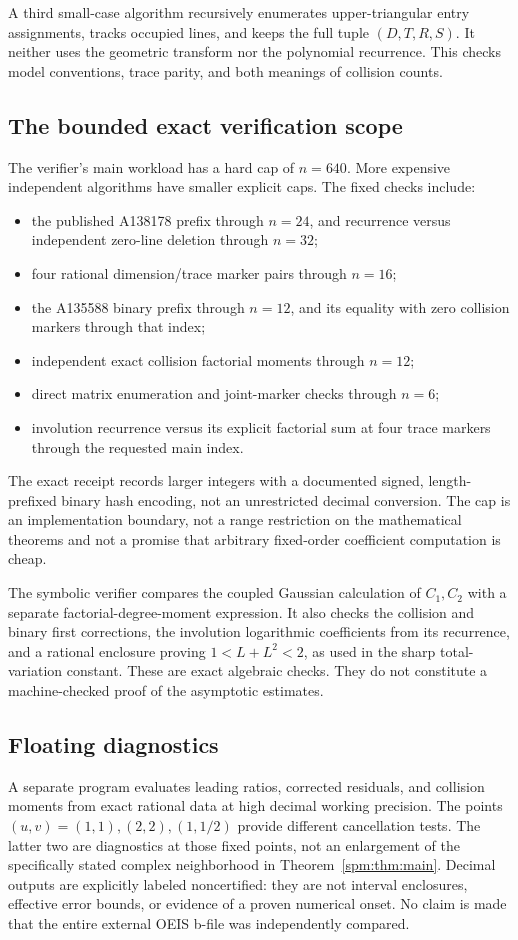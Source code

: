 A third small-case algorithm recursively enumerates upper-triangular entry assignments, tracks occupied lines, and keeps the full tuple $(D,T,R,S)$. It neither uses the geometric transform nor the polynomial recurrence. This checks model conventions, trace parity, and both meanings of collision counts.

\subsection{The bounded exact verification scope}
The verifier's main workload has a hard cap of $n=640$. More expensive independent algorithms have smaller explicit caps. The fixed checks include:
\begin{itemize}
\item the published A138178 prefix through $n=24$, and recurrence versus independent zero-line deletion through $n=32$;
\item four rational dimension/trace marker pairs through $n=16$;
\item the A135588 binary prefix through $n=12$, and its equality with zero collision markers through that index;
\item independent exact collision factorial moments through $n=12$;
\item direct matrix enumeration and joint-marker checks through $n=6$;
\item involution recurrence versus its explicit factorial sum at four trace markers through the requested main index.
\end{itemize}
The exact receipt records larger integers with a documented signed, length-prefixed binary hash encoding, not an unrestricted decimal conversion. The cap is an implementation boundary, not a range restriction on the mathematical theorems and not a promise that arbitrary fixed-order coefficient computation is cheap.

The symbolic verifier compares the coupled Gaussian calculation of $C_1,C_2$ with a separate factorial-degree-moment expression. It also checks the collision and binary first corrections, the involution logarithmic coefficients from its recurrence, and a rational enclosure proving $1<L+L^2<2$, as used in the sharp total-variation constant. These are exact algebraic checks. They do not constitute a machine-checked proof of the asymptotic estimates.

\subsection{Floating diagnostics}
A separate program evaluates leading ratios, corrected residuals, and collision moments from exact rational data at high decimal working precision. The points $(u,v)=(1,1),(2,2),(1,1/2)$ provide different cancellation tests. The latter two are diagnostics at those fixed points, not an enlargement of the specifically stated complex neighborhood in Theorem~\ref{spm:thm:main}. Decimal outputs are explicitly labeled noncertified: they are not interval enclosures, effective error bounds, or evidence of a proven numerical onset. No claim is made that the entire external OEIS b-file was independently compared.

